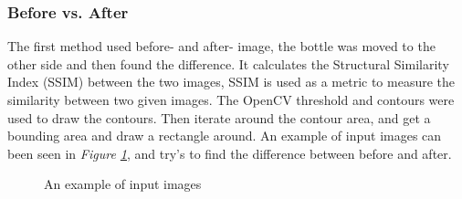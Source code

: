 \subsubsection*{Before vs. After}\label{beforeandafter}
The first method used before- and after- image, the bottle was moved to the other side and then found the difference. It calculates the Structural Similarity Index (SSIM) between the two images, SSIM\cite{datta_all_2021} is used as a metric to measure the similarity between two given images. The OpenCV threshold and contours were used to draw the contours. Then iterate around the contour area, and get a bounding area and draw a rectangle around.
An example of input images can been seen in \textit{Figure \ref{figure: beforeafter}}, and try's to find the difference between before and after.
\begin{figure}[h]
    \centering
    \hfill
    \caption{An example of input images}
    \label{figure: beforeafter}
\end{figure}

